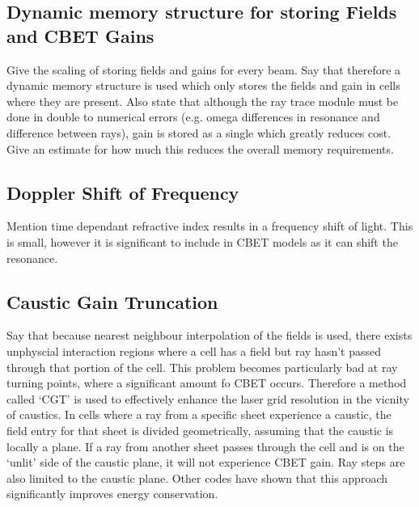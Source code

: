 \subsection{Dynamic memory structure for storing Fields and CBET Gains}

Give the scaling of storing fields and gains for every beam.
Say that therefore a dynamic memory structure is used which only stores the fields and gain in cells where they are present.
Also state that although the ray trace module must be done in double to numerical errors (e.g. omega differences in resonance and difference between rays), gain is stored as a single which greatly reduces cost.
Give an estimate for how much this reduces the overall memory requirements.

\subsection{Doppler Shift of Frequency}
\label{sec:SOLAS_doppler}

Mention time dependant refractive index results in a frequency shift of light.
This is small, however it is significant to include in CBET models as it can shift the resonance.

\subsection{Caustic Gain Truncation}

Say that because nearest neighbour interpolation of the fields is used, there exists unphyscial interaction regions where a cell has a field but ray hasn't passed through that portion of the cell.
This problem becomes particularly bad at ray turning points, where a significant amount fo CBET occurs.
Therefore a method called `CGT' is used to effectively enhance the laser grid resolution in the vicnity of caustics.
In cells where a ray from a specific sheet experience a caustic, the field entry for that sheet is divided geometrically, assuming that the caustic is locally a plane.
If a ray from another sheet passes through the cell and is on the `unlit' side of the caustic plane, it will not experience CBET gain.
Ray steps are also limited to the caustic plane.
Other codes have shown that this approach significantly improves energy conservation.

